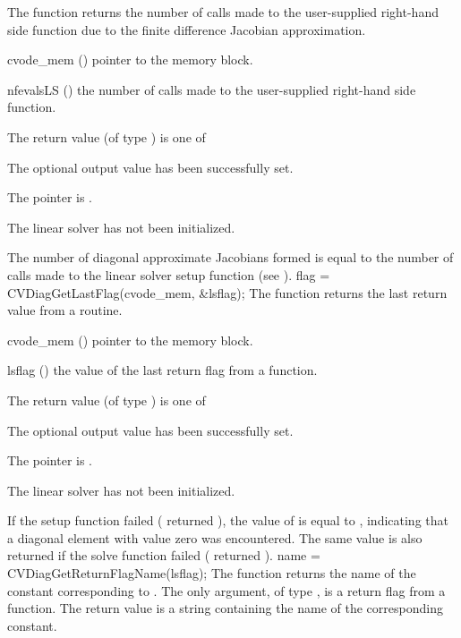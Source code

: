 {
  The function  returns the
  number of calls made to the user-supplied right-hand side function due to the
  finite difference Jacobian approximation.
}
{
  \begin{args}
  \item[cvode\_mem] ()
    pointer to the {\cvode} memory block.
  \item[nfevalsLS] ()
    the number of calls made to the user-supplied right-hand side function.
  \end{args}
}
{
  The return value  (of type ) is one of
  \begin{args}
  \item[\Id{CVDIAG\_SUCCESS}]
    The optional output value has been successfully set.
  \item[\Id{CVDIAG\_MEM\_NULL}]
    The  pointer is .
  \item[\Id{CVDIAG\_LMEM\_NULL}]
    The {\cvdiag} linear solver has not been initialized.
  \end{args}
}
{
  The number of diagonal approximate Jacobians formed is
  equal to the number of calls made to the linear solver setup function
  (see ).
}
{
  flag = CVDiagGetLastFlag(cvode\_mem, \&lsflag);
}
{
  The function  returns the
  last return value from a {\cvdiag} routine.
}
{
  \begin{args}
  \item[cvode\_mem] ()
    pointer to the {\cvode} memory block.
  \item[lsflag] ()
    the value of the last return flag from a {\cvdiag} function.
  \end{args}
}
{
  The return value  (of type ) is one of
  \begin{args}
  \item[\Id{CVDIAG\_SUCCESS}]
    The optional output value has been successfully set.
  \item[\Id{CVDIAG\_MEM\_NULL}]
    The  pointer is .
  \item[\Id{CVDIAG\_LMEM\_NULL}]
    The {\cvdiag} linear solver has not been initialized.
  \end{args}
}
{
  If the {\cvdiag} setup function failed ( returned ),
  the value of  is equal to , indicating that a
  diagonal element with value zero was encountered.
  The same value is also returned if the {\cvdiag} solve function failed
  ( returned ).
}
{
  name = CVDiagGetReturnFlagName(lsflag);
}
{
  The function  returns the
  name of the {\cvdiag} constant corresponding to .
}
{
  The only argument, of type , is a return flag from a {\cvdiag} function.
}
{
  The return value is a string containing the name of the corresponding constant.
}
{}


